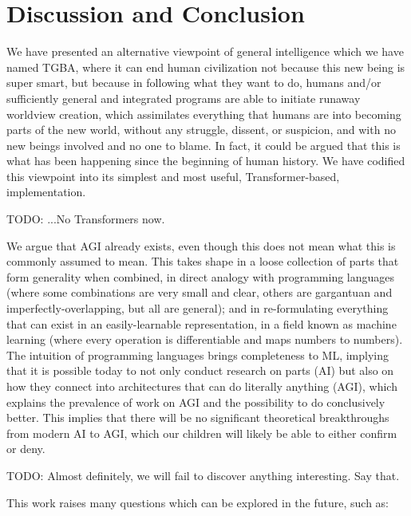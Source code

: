 \documentclass{article}
\begin{document}
\section{Discussion and Conclusion}

We have presented an alternative viewpoint of general intelligence which we have named TGBA, where it can end human civilization not because this new being is super smart, but because in following what they want to do, humans and/or sufficiently general and integrated programs are able to initiate runaway worldview creation, which assimilates everything that humans are into becoming parts of the new world, without any struggle, dissent, or suspicion, and with no new beings involved and no one to blame. In fact, it could be argued that this is what has been happening since the beginning of human history. We have codified this viewpoint into its simplest and most useful, Transformer-based, implementation.

    TODO: ...No Transformers now.

We argue that AGI already exists, even though this does not mean what this is commonly assumed to mean. This takes shape in a loose collection of parts that form generality when combined, in direct analogy with programming languages (where some combinations are very small and clear, others are gargantuan and imperfectly-overlapping, but all are general); and in re-formulating everything that can exist in an easily-learnable representation, in a field known as machine learning (where every operation is differentiable and maps numbers to numbers). The intuition of programming languages brings completeness to ML, implying that it is possible today to not only conduct research on parts (AI) but also on how they connect into architectures that can do literally anything (AGI), which explains the prevalence of work on AGI and the possibility to do conclusively better. This implies that there will be no significant theoretical breakthroughs from modern AI to AGI, which our children will likely be able to either confirm or deny.

    TODO: Almost definitely, we will fail to discover anything interesting. Say that.

This work raises many questions which can be explored in the future, such as:
\end{document}
